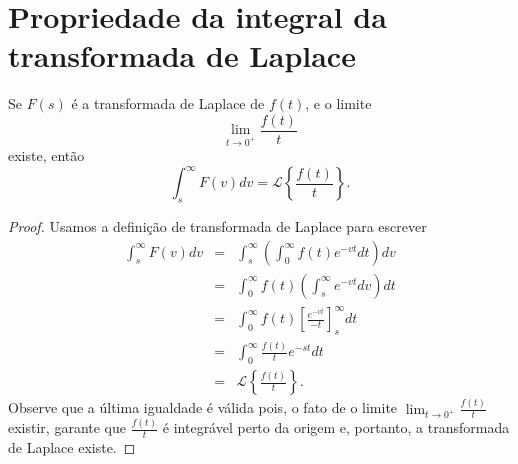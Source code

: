 \documentclass[Main.tex]{subfiles}
\begin{document}
\section{Propriedade da integral da transformada de Laplace}
\begin{propr}{\label{prop_int_transf}}Se $F(s)$ é a transformada de Laplace de $f(t)$, e o limite
$$
\lim_{t\to 0^+}\frac{f(t)}{t}
$$
existe, então
\begin{equation}
\int_s^\infty F(v)dv =\mathcal{L}\left\{\frac{f(t)}{t}\right\}.
\end{equation}
 \end{propr}
\begin{proof} Usamos a definição de transformada de Laplace para escrever
\begin{eqnarray*}
\int_s^\infty F(v)dv&=&\int_s^\infty\left(\int_0^\infty f(t)e^{-vt}dt\right)dv\\
&=&\int_0^\infty f(t)\left(\int_s^\infty e^{-vt} dv \right)dt\\
&=&\int_0^\infty f(t)\left[\frac{ e^{-vt}}{-t} \right]_s^\infty dt\\
&=&\int_0^\infty \frac{f(t)}{t} e^{-st}  dt\\
&=&\mathcal{L}\left\{ \frac{f(t)}{t} \right\}.
\end{eqnarray*}
Observe que a última igualdade é válida pois, o fato de o limite $\lim_{t\to 0^+}\frac{f(t)}{t}$ existir, garante que $\frac{f(t)}{t}$ é integrável perto da origem e, portanto, a transformada de Laplace existe.
\end{proof}
\end{document}
